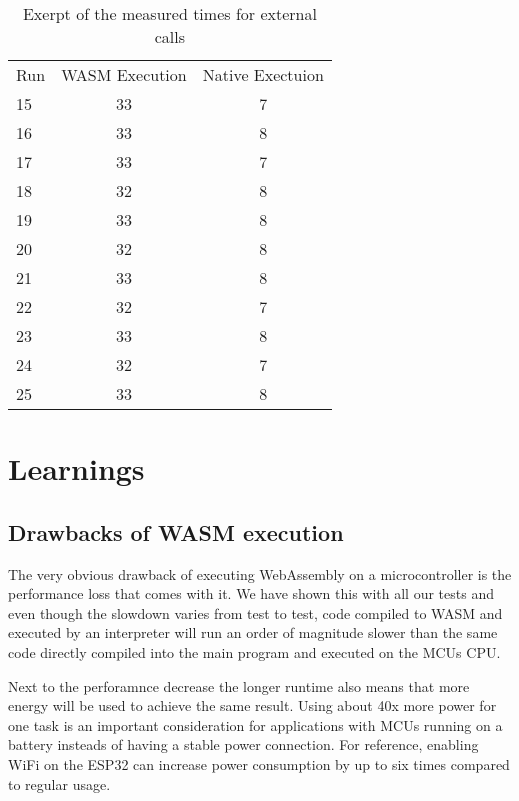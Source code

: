 \begin{table}
    \begin{tabular}{l c c}
        Run & WASM Execution & Native Exectuion \\
        15  & 33             & 7                \\
        16  & 33             & 8                \\
        17  & 33             & 7                \\
        18  & 32             & 8                \\
        19  & 33             & 8                \\
        20  & 32             & 8                \\
        21  & 33             & 8                \\
        22  & 32             & 7                \\
        23  & 33             & 8                \\
        24  & 32             & 7                \\
        25  & 33             & 8                \\
    \end{tabular}
    \caption{Exerpt of the measured times for external calls}
    \label{tab:times_native}
\end{table}

\section{Learnings}
\subsection{Drawbacks of WASM execution}
The very obvious drawback of executing WebAssembly on a microcontroller is the performance loss that comes with it. We have shown this with all our tests and even though the slowdown varies from test to test, code compiled to WASM and executed by an interpreter will run an order of magnitude slower than the same code directly compiled into the main program and executed on the MCUs CPU.

Next to the perforamnce decrease the longer runtime also means that more energy will be used to achieve the same result. Using about 40x more power for one task is an important consideration for applications with MCUs running on a battery insteads of having a stable power connection. For reference, enabling WiFi on the ESP32 can increase power consumption by up to six times compared to regular usage\autocite{espressif_esp32_2020}.

